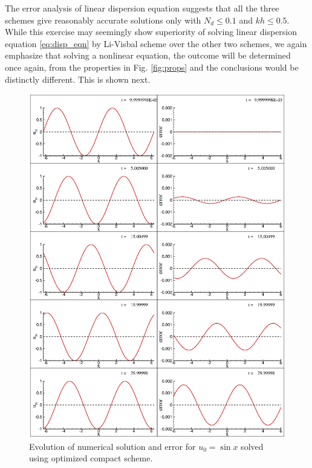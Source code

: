 The error analysis of linear dispersion equation suggests that all the three schemes give reasonably accurate solutions only with $N_d \leq 0.1$ and $kh \leq 0.5$. While this exercise may seemingly show superiority of solving linear dispersion equation \eqref{eq:disp_eqn} by Li-Visbal scheme over the other two schemes, we again emphasize that solving a nonlinear equation, the outcome will be determined once again, from the properties in Fig. \ref{fig:props} and the conclusions would be distinctly different. This is shown next. 

\begin{figure}[!h]
\center
\includegraphics[width=0.8\linewidth]{Fig_8}
\caption{Evolution of numerical solution and error for $u_0=\sin x$ solved using optimized compact scheme.}
\label{fig:low1}
\end{figure}

